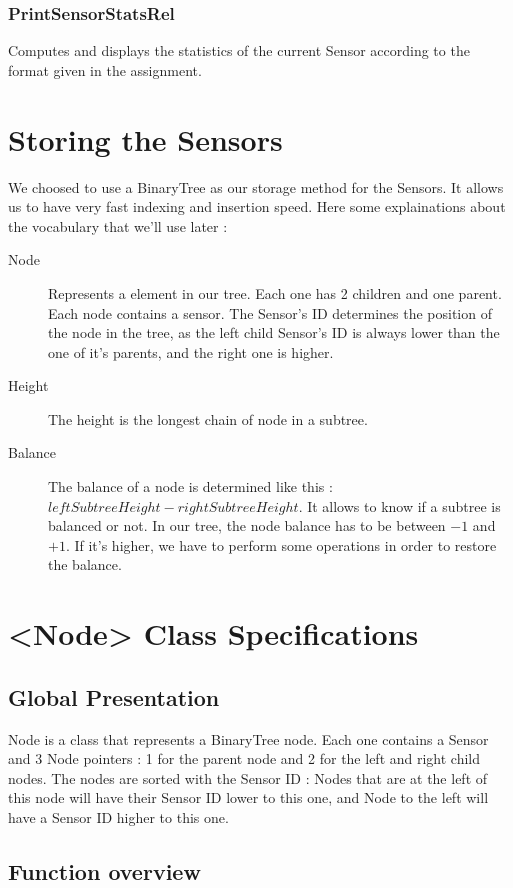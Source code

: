\documentclass[10pt]{article}
\begin{document}
\subsubsection*{PrintSensorStatsRel}
Computes and displays the statistics of the current Sensor according to the format given in the assignment.

\section{Storing the Sensors}
We choosed to use a BinaryTree as our storage method for the Sensors. It allows us to have very fast indexing and insertion speed.
Here some explainations about the vocabulary that we'll use later :
\begin{description}
	\item[Node] Represents a element in our tree. Each one has 2 children and one parent. Each node contains a sensor. The Sensor's ID determines the position of the node in the tree, as the left child Sensor's ID is always lower than the one of it's parents, and the right one is higher.
	\item[Height] The height is the longest chain of node in a subtree.
	\item[Balance] The balance of a node is determined like this : $ leftSubtreeHeight - rightSubtreeHeight$. It allows to know if a subtree is balanced or not. In our tree, the node balance has to be between $-1$ and $+1$. If it's higher, we have to perform some operations in order to restore the balance.
\end{description}

\section{<Node> Class Specifications}
\subsection{Global Presentation}


Node is a class that represents a BinaryTree node. Each one contains a Sensor and 3 Node pointers : 1 for the parent node and 2 for the left and right child nodes. The nodes are sorted with the Sensor ID : Nodes that are at the left of this node will have their Sensor ID lower to this one, and Node to the left will have a Sensor ID higher to this one.
\subsection{Function overview}
\end{document}
